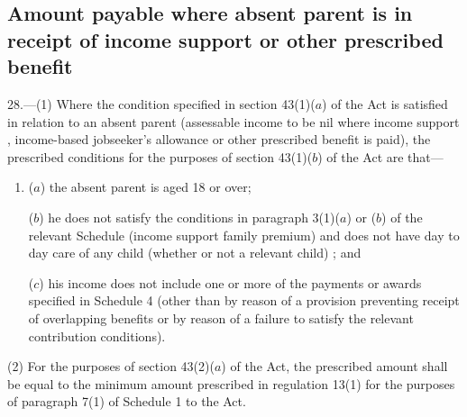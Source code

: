 \documentclass[12pt,a4paper]{article}
\begin{document}

\subsection[28. Amount payable where absent parent is in receipt of income support or other prescribed benefit]{Amount payable where absent parent is in receipt of income support or other prescribed benefit}

28.—(1) Where the condition specified in section 43(1)($a$) of the Act is satisfied in relation to an absent parent (assessable income to be nil where income support%
, income-based jobseeker’s allowance  %
 or other prescribed benefit is paid), the prescribed conditions for the purposes of section 43(1)($b$) of the Act are that—
\begin{enumerate}\item[]
($a$) the absent parent is aged 18 or over;

($b$) he does not satisfy the conditions in paragraph 
3(1)($a$) or ($b$)  %
of the relevant Schedule (income support family premium)
and does not have day to day care of any child (whether or not a relevant child)%
; and

($c$) 
his income does not include %
one or more of the payments or awards specified in Schedule 4 (other than by reason of a provision preventing receipt of overlapping benefits or by reason of a failure to satisfy the relevant contribution conditions).
\end{enumerate}

(2) For the purposes of section 43(2)($a$) of the Act, the prescribed amount shall be equal to the minimum amount prescribed in regulation 13(1) for the purposes of paragraph 7(1) of Schedule 1 to the Act.
\end{document}
